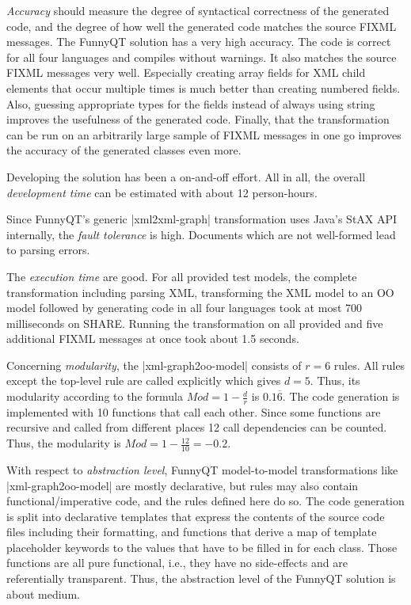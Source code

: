 \documentclass[submission]{eptcs}
\newcommand{\code}{\clojureinline}
\begin{document}
\emph{Accuracy} should measure the degree of syntactical correctness of the
generated code, and the degree of how well the generated code matches the
source FIXML messages.  The FunnyQT solution has a very high accuracy.  The
code is correct for all four languages and compiles without warnings.  It also
matches the source FIXML messages very well.  Especially creating array fields
for XML child elements that occur multiple times is much better than creating
numbered fields.  Also, guessing appropriate types for the fields instead of
always using string improves the usefulness of the generated code.  Finally,
that the transformation can be run on an arbitrarily large sample of FIXML
messages in one go improves the accuracy of the generated classes even more.

Developing the solution has been a on-and-off effort.  All in all, the overall
\emph{development time} can be estimated with about 12 person-hours.

Since FunnyQT's generic \code|xml2xml-graph| transformation uses Java's StAX
API internally, the \emph{fault tolerance} is high.  Documents which are not
well-formed lead to parsing errors.

The \emph{execution time} are good.  For all provided test models, the complete
transformation including parsing XML, transforming the XML model to an OO model
followed by generating code in all four languages took at most 700 milliseconds
on SHARE.  Running the transformation on all provided and five additional FIXML
messages at once took about 1.5 seconds.


Concerning \emph{modularity}, the \code|xml-graph2oo-model| consists of \(r=6\)
rules.  All rules except the top-level rule are called explicitly which gives
\(d=5\).
Thus, its modularity according to the formula \(Mod = 1 - \frac{d}{r}\)
is \(0.1\overline{6}\).
The code generation is implemented with 10 functions that call each other.
Since some functions are recursive and called from different places 12 call
dependencies can be counted.  Thus, the modularity is
\(Mod = 1 - \frac{12}{10} = -0.2\).


With respect to \emph{abstraction level}, FunnyQT model-to-model
transformations like \code|xml-graph2oo-model| are mostly declarative, but
rules may also contain functional/imperative code, and the rules defined here
do so. The code generation is split into declarative templates that express the
contents of the source code files including their formatting, and functions
that derive a map of template placeholder keywords to the values that have to
be filled in for each class.  Those functions are all pure functional, i.e.,
they have no side-effects and are referentially transparent.  Thus, the
abstraction level of the FunnyQT solution is about medium.
\end{document}
